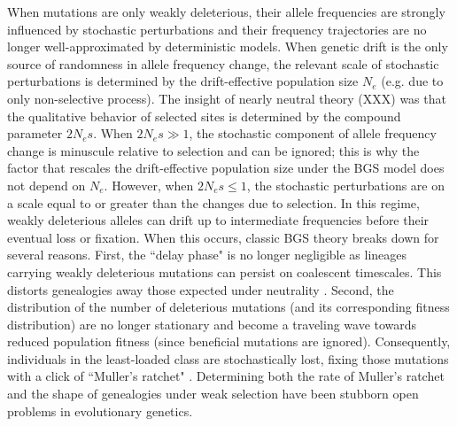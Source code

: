 \documentclass[11pt]{article}
\begin{document}
When mutations are only weakly deleterious, their allele frequencies are
strongly influenced by stochastic perturbations and their frequency
trajectories are no longer well-approximated by deterministic models. When
genetic drift is the only source of randomness in allele frequency change, the
relevant scale of stochastic perturbations is determined by the drift-effective
population size $N_e$ (e.g. due to only non-selective process). The insight of
nearly neutral theory (XXX) was that the qualitative behavior of selected sites
is determined by the compound parameter $2N_e s$. When $2N_e s \gg 1$, the
stochastic component of allele frequency change is minuscule relative to
selection and can be ignored; this is why the factor that rescales the
drift-effective population size under the BGS model does not depend on $N_e$.
However, when $2N_e s \le 1$, the stochastic perturbations are on a scale equal
to or greater than the changes due to selection. In this regime, weakly
deleterious alleles can drift up to intermediate frequencies before their
eventual loss or fixation. When this occurs, classic BGS theory breaks down for
several reasons. First, the ``delay phase" is no longer negligible as lineages
carrying weakly deleterious mutations can persist on coalescent timescales.
This distorts genealogies away those expected under neutrality
\parencite{Przeworski1999-mb,OFallon2010-my,Higgs1995-xc}. Second, the
distribution of the number of deleterious mutations (and its corresponding
fitness distribution) are no longer stationary and become a traveling wave
\parencite{Rouzine2008-qz,Good2013-lp,Gessler1995-hz} towards reduced
population fitness (since beneficial mutations are ignored). Consequently,
individuals in the least-loaded class are stochastically lost, fixing those
mutations with a click of ``Muller's ratchet" \parencite{Muller1964-ki}.
Determining both the rate of Muller's ratchet
\parencite{Haigh1978-gt,Gordo2002-dr,Gessler1995-hz} and the shape of
genealogies under weak selection have been stubborn open problems in
evolutionary genetics.
\end{document}
